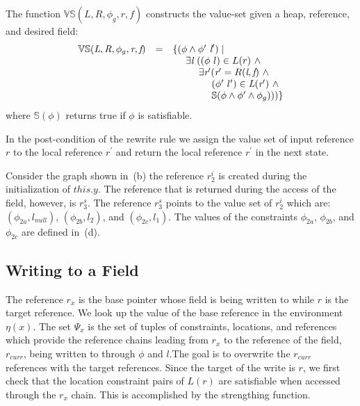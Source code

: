 \begin{definition}
\label{def:VS}
The function $\mathbb{VS}(L,R,\phi_g,r,f)$ constructs the value-set given a
heap, reference, and desired field:
\[
\begin{array}{rcl}
  \mathbb{VS}(\cfgnt{L},\cfgnt{R},\phi_g,\cfgnt{r},\cfgnt{f}) & = & \{(\phi\wedge\phi^\prime\ \cfgnt{l}^\prime) \mid \\
  & & \ \ \ \ \exists \cfgnt{l}\ ((\phi\ l) \in L(r)\ \wedge \\
  & & \ \ \ \ \ \ \ \ \exists \cfgnt{r}^\prime ( \cfgnt{r}^\prime = R(\cfgnt{l},\cfgnt{f})\ \wedge \\
  & & \ \ \ \ \ \ \ \ \ \ \ \ (\phi^\prime\ l^\prime) \in \cfgnt{L}(\cfgnt{r}^\prime)\ \wedge\\
  & & \ \ \ \ \ \ \ \ \ \ \ \ \mathbb{S}(\phi\wedge\phi^\prime\wedge \phi_g)))\}
\end{array}
\]
where $\mathbb{S}(\phi)$ returns true if $\phi$ is satisfiable.
\end{definition}


In the post-condition of the rewrite rule we assign
the value set of input reference $r$ to the local reference $r^\prime$
and return the local reference $r^\prime$ in the next state.

Consider the graph shown in~(b) the reference
$r_2^i$ is created during the initialization of $\mathit{this}.y$. The
reference that is returned during the access of the field, however, is
$r_3^s$. The reference $r_3^s$ points to the value set of $r_2^i$
which are: $(\phi_{2a}, l_\mathit{null})$, $(\phi_{2b}, l_2)$, and
$(\phi_{2c}, l_1)$. The values of the constraints $\phi_{2a}$,
$\phi_{2b}$, and $\phi_{2c}$ are defined in~(d).

\subsection{Writing to a Field}

The reference $r_x$ is the base pointer whose field is being written
to while $r$ is the target reference. We look up the value of the base
reference in the environment $\eta(x)$. The set $\Psi_x$ is the set of
tuples of constraints, locations, and references which provide the
reference chains leading from $r_x$ to the reference of the field,
$r_\mathit{curr}$, being written to through $\phi$ and $l$.The goal is
to overwrite the $r_\mathit{curr}$ references with the target
references. Since the target of the write is $r$, we first check that the
location constraint pairs of $L(r)$ are satisfiable when accessed
through the $r_x$ chain. This is accomplished by the strengthing
function.

